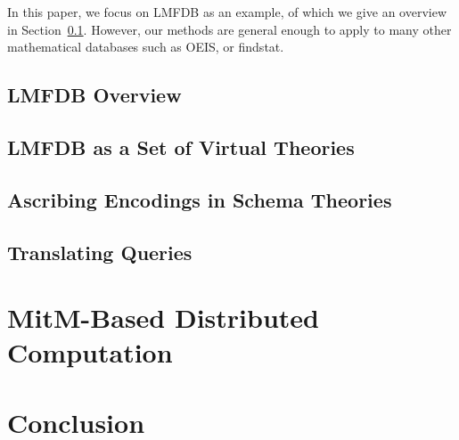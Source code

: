 \documentclass[book]{deliverablereport}
\providecommand{\lmfdb}{\textsf{LMFDB}\xspace}
\begin{document}
In this paper, we focus on \lmfdb as an example, of which we give an overview in Section~\ref{sec:lmfdb}.
However, our methods are general enough to apply to many other mathematical databases such as OEIS, or findstat.

 \subsection{LMFDB Overview}\label{sec:lmfdb}
  
 \subsection[Virtual Theories]{\lmfdb as a Set of Virtual Theories}\label{sec:vt}
  
 \subsection{Ascribing Encodings in Schema Theories}\label{sec:vt:codec}
  
 \subsection{Translating Queries}\label{sec:qmt}
  

\section[Distributed Computation]{MitM-Based Distributed Computation}\label{sec:case}


\section{Conclusion}\label{sec:concl}

\end{document}
